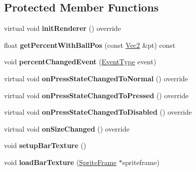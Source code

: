 \subsection*{Protected Member Functions}
\begin{DoxyCompactItemize}
\item 
\mbox{\label{classui_1_1Slider_afc3a2f8f72e4c5f024b01b4d6e4b9892}} 
virtual void {\bfseries init\+Renderer} () override
\item 
\mbox{\label{classui_1_1Slider_a814b24eb499409d844cbaa06085fb00d}} 
float {\bfseries get\+Percent\+With\+Ball\+Pos} (const \hyperlink{classVec2}{Vec2} \&pt) const
\item 
\mbox{\label{classui_1_1Slider_a7ce77231e9954cce68898076f62ca777}} 
void {\bfseries percent\+Changed\+Event} (\hyperlink{classui_1_1Slider_aaaaec31aa46f491595d338978033c267}{Event\+Type} event)
\item 
\mbox{\label{classui_1_1Slider_ad9f4e04f2b4c6245677a0f30056dffd5}} 
virtual void {\bfseries on\+Press\+State\+Changed\+To\+Normal} () override
\item 
\mbox{\label{classui_1_1Slider_a5e15fe49d0ae236b0fc06f98afabf9be}} 
virtual void {\bfseries on\+Press\+State\+Changed\+To\+Pressed} () override
\item 
\mbox{\label{classui_1_1Slider_a507def6a4e10c2cf94c28de597cf69e7}} 
virtual void {\bfseries on\+Press\+State\+Changed\+To\+Disabled} () override
\item 
\mbox{\label{classui_1_1Slider_a63c7e811d09ce7c65801ce3ddb7472d1}} 
virtual void {\bfseries on\+Size\+Changed} () override
\item 
\mbox{\label{classui_1_1Slider_a4a259c44d05bb65a8eea19479ab75b8e}} 
void {\bfseries setup\+Bar\+Texture} ()
\item 
\mbox{\label{classui_1_1Slider_a0a6a3ed52773b35357e37d64f10d22f4}} 
void {\bfseries load\+Bar\+Texture} (\hyperlink{classSpriteFrame}{Sprite\+Frame} $\ast$spriteframe)
\item 

\end{DoxyCompactItemize}
